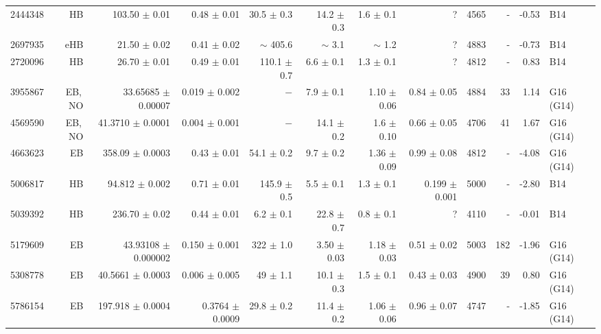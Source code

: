 \begin{landscape}
\begin{longtable}{rrrrrrrrrrrl}
\hline
	2444348	&	HB	&	103.50	$\pm$	0.01	&	0.48	$\pm$	0.01	&	30.5	$\pm$	0.3	&		14.2	$\pm$	0.3	&		1.6	$\pm$	0.1	&	?			&	4565	&	-	&	-0.53	&	B14	\\	%
	2697935	&	eHB	&	21.50	$\pm$	0.02	&	0.41	$\pm$	0.02	&	$\sim$	405.6		&	$\sim$	3.1			&	$\sim$	1.2			&	?			&	4883	&	-	&	-0.73	&	B14	\\	%
	2720096	&	HB	&	26.70	$\pm$	0.01	&	0.49	$\pm$	0.01	&	110.1	$\pm$	0.7	&		6.6	$\pm$	0.1	&		1.3	$\pm$	0.1	&	?			&	4812	&	-	&	0.83	&	B14	\\	%
	3955867	&	EB,\,NO	&	33.65685	$\pm$	0.00007	&	0.019	$\pm$	0.002	&	$-$			&		7.9	$\pm$	0.1	&		1.10	$\pm$	0.06	&	0.84	$\pm$	0.05	&	4884	&	33	&	1.14	&	G16 (G14)	\\	%
	4569590	&	EB,\,NO	&	41.3710	$\pm$	0.0001	&	0.004	$\pm$	0.001	&	$-$			&		14.1	$\pm$	0.2	&		1.6	$\pm$	0.10	&	0.66	$\pm$	0.05	&	4706	&	41	&	1.67	&	G16 (G14)	\\	%
	4663623	&	EB	&	358.09	$\pm$	0.0003	&	0.43	$\pm$	0.01	&	54.1	$\pm$	0.2	&		9.7	$\pm$	0.2	&		1.36	$\pm$	0.09	&	0.99	$\pm$	0.08	&	4812	&	-	&	-4.08	&	G16 (G14)	\\	%
	5006817	&	HB	&	94.812	$\pm$	0.002	&	0.71	$\pm$	0.01	&	145.9	$\pm$	0.5	&		5.5	$\pm$	0.1	&		1.3	$\pm$	0.1	&	0.199	$\pm$	0.001	&	5000	&	-	&	-2.80	&	B14	\\	%
	5039392	&	HB	&	236.70	$\pm$	0.02	&	0.44	$\pm$	0.01	&	6.2	$\pm$	0.1	&		22.8	$\pm$	0.7	&		0.8	$\pm$	0.1	&	?			&	4110	&	-	&	-0.01	&	B14	\\	%
	5179609	&	EB	&	43.93108	$\pm$	0.000002	&	0.150	$\pm$	0.001	&	322	$\pm$	1.0	&		3.50	$\pm$	0.03	&		1.18	$\pm$	0.03	&	0.51	$\pm$	0.02	&	5003	&	182	&	-1.96	&	G16 (G14)	\\	%
	5308778	&	EB	&	40.5661	$\pm$	0.0003	&	0.006	$\pm$	0.005	&	49	$\pm$	1.1	&		10.1	$\pm$	0.3	&		1.5	$\pm$	0.1	&	0.43	$\pm$	0.03	&	4900	&	39	&	0.80	&	G16 (G14)	\\	%
	5786154	&	EB	&	197.918	$\pm$	0.0004	&	0.3764	$\pm$	0.0009	&	29.8	$\pm$	0.2	&		11.4	$\pm$	0.2	&		1.06	$\pm$	0.06	&	0.96	$\pm$	0.07	&	4747	&	-	&	-1.85	&	G16 (G14)	\\	%

\end{longtable}
\end{landscape}
